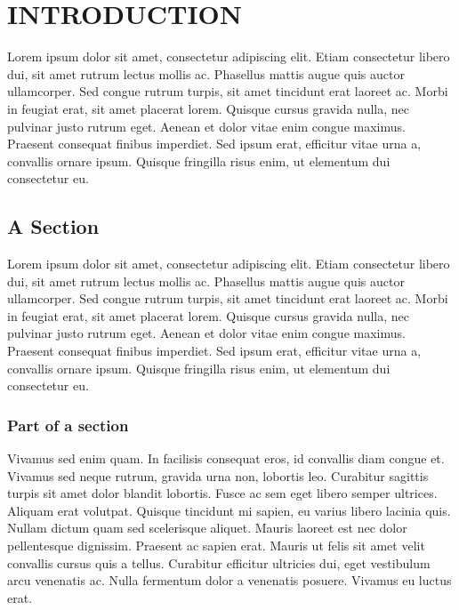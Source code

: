 \chapter{INTRODUCTION}

Lorem ipsum\cite{loremipsum} dolor sit amet, consectetur adipiscing elit. Etiam consectetur libero dui, sit amet rutrum lectus mollis ac. Phasellus mattis augue quis auctor ullamcorper. Sed congue rutrum turpis, sit amet tincidunt erat laoreet ac. Morbi in feugiat erat, sit amet placerat lorem. Quisque cursus gravida nulla, nec pulvinar justo rutrum eget. Aenean et dolor vitae enim congue maximus. Praesent consequat finibus imperdiet. Sed ipsum erat, efficitur vitae urna a, convallis ornare ipsum. Quisque fringilla risus enim, ut elementum dui consectetur eu.

\section{A Section}

Lorem ipsum\cite{loremipsum} dolor sit amet, consectetur adipiscing elit. Etiam consectetur libero dui, sit amet rutrum lectus mollis ac. Phasellus mattis augue quis auctor ullamcorper. Sed congue rutrum turpis, sit amet tincidunt erat laoreet ac. Morbi in feugiat erat, sit amet placerat lorem. Quisque cursus gravida nulla, nec pulvinar justo rutrum eget. Aenean et dolor vitae enim congue maximus. Praesent consequat finibus imperdiet. Sed ipsum erat, efficitur vitae urna a, convallis ornare ipsum. Quisque fringilla risus enim, ut elementum dui consectetur eu.

\subsection{Part of a section}

Vivamus sed enim quam. In facilisis consequat eros, id convallis diam congue et. Vivamus sed neque rutrum, gravida urna non, lobortis leo. Curabitur sagittis turpis sit amet dolor blandit lobortis. Fusce ac sem eget libero semper ultrices. Aliquam erat volutpat. Quisque tincidunt mi sapien, eu varius libero lacinia quis. Nullam dictum quam sed scelerisque aliquet. Mauris laoreet est nec dolor pellentesque dignissim. Praesent ac sapien erat. Mauris ut felis sit amet velit convallis cursus quis a tellus. Curabitur efficitur ultricies dui, eget vestibulum arcu venenatis ac. Nulla fermentum dolor a venenatis posuere. Vivamus eu luctus erat.\\


